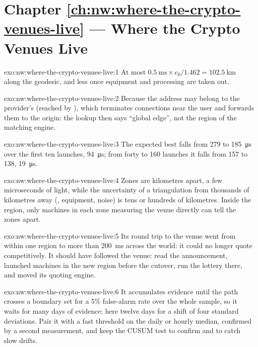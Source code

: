 \section*{Chapter \ref{ch:nw:where-the-crypto-venues-live} --- Where the Crypto Venues Live}

\begin{solution}{exo:nw:where-the-crypto-venues-live:1}
At most $0.5~\mathrm{ms} \times c_0 / 1.462 = \qty{102.5}{\kilo\metre}$ along the geodesic, and less once equipment and processing are taken out.
\end{solution}

\begin{solution}{exo:nw:where-the-crypto-venues-live:2}
Because the address may belong to the provider's  (reached by ), which terminates connections near the user and forwards
them to the origin: the lookup then says ``global edge'', not the region of the matching engine.
\end{solution}

\begin{solution}{exo:nw:where-the-crypto-venues-live:3}
The expected best falls from 279 to \qty{185}{\micro\second} over the first ten launches, \qty{94}{\micro\second}; from forty to 160 launches it falls
from 157 to 138, \qty{19}{\micro\second}.
\end{solution}

\begin{solution}{exo:nw:where-the-crypto-venues-live:4}
Zones are kilometres apart, a few microseconds of light, while the uncertainty of a triangulation from thousands of kilometres away (,
equipment, noise) is tens or hundreds of kilometres. Inside the region, only machines in each zone measuring the venue directly can tell the zones
apart.
\end{solution}

\begin{solution}{exo:nw:where-the-crypto-venues-live:5}
Its round trip to the venue went from within one region to more than \qty{200}{\milli\second} across the world: it could no longer quote competitively.
It should have followed the venue: read the announcement, launched machines in the new region before the cutover, run the lottery there, and moved
its quoting engine.
\end{solution}

\begin{solution}{exo:nw:where-the-crypto-venues-live:6}
It accumulates evidence until the path crosses a boundary set for a 5\% false-alarm rate over the whole sample, so it waits for many days of
evidence; here twelve days for a shift of four standard deviations. Pair it with a fast threshold on the daily or hourly median, confirmed by a
second measurement, and keep the CUSUM test to confirm and to catch slow drifts.
\end{solution}

